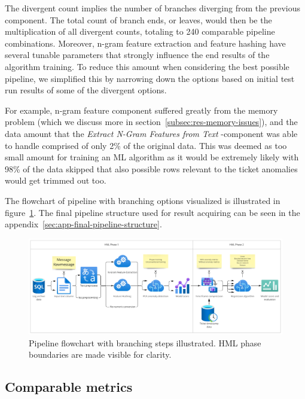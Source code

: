 The divergent count implies the number of branches
diverging from the previous component.
The total count of branch ends, or leaves,
would then be the multiplication of all divergent counts,
totaling to 240 comparable pipeline combinations.
Moreover,
n-gram feature extraction and feature hashing
have several tunable parameters
that strongly influence the end results of the algorithm training.
To reduce this amount when considering the best possible pipeline,
we simplified this by narrowing down the options
based on initial test run results of some of the divergent options.

For example,
n-gram feature component suffered greatly from the memory problem
(which we discuss more in section~\ref{subsec:res-memory-issues}),
and the data amount that the \textit{Extract N-Gram Features from Text} -component was able to handle
comprised of only 2\% of the original data.
This was deemed as too small amount for training an ML algorithm
as it would be extremely likely with 98\% of the data skipped
that also possible rows relevant to the ticket anomalies
would get trimmed out too.

The flowchart of pipeline with branching options visualized
is illustrated in figure~\ref{fig:pipeline-flowchart}.
The final pipeline structure used for result acquiring
can be seen in the appendix~\ref{sec:app-final-pipeline-structure}.
\begin{figure}[htb]
    \centering
    \includegraphics[width=\textwidth]{./appendices/pipeline-flowchart.jpg}
    \caption{Pipeline flowchart with branching steps illustrated.
    HML phase boundaries are made visible for clarity.
    \label{fig:pipeline-flowchart}}
\end{figure}




\subsection{Comparable metrics}\label{subsec:pipe-comparable-metrics}

